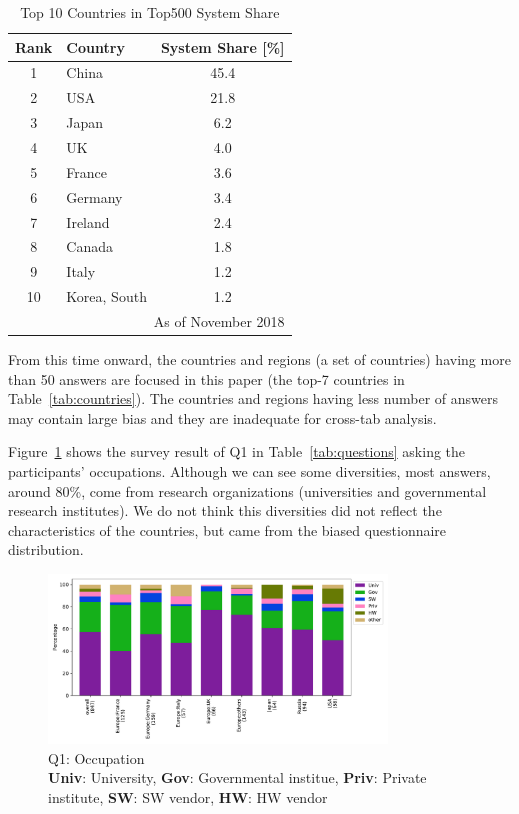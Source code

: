 \documentclass[submit,techrep,noauthor,english]{ipsj}
\begin{document}
\begin{table}[htb]%
\begin{center}%
  \caption{Top 10 Countries in Top500 System Share\cite{Top500}}
  \label{tab:top500}%
\begin{tabular}{c|l|c}%
\hline%
Rank & Country & System Share [\%] \\%
\hline%
1 & China & 45.4 \\%
2 & USA & 21.8 \\%
3 & Japan & 6.2 \\%
4 & UK & 4.0 \\%
5 & France & 3.6 \\%
6 & Germany & 3.4 \\%
7 & Ireland & 2.4 \\%
8 & Canada & 1.8 \\%
9 & Italy & 1.2 \\%
10 & Korea, South & 1.2 \\%
\hline%
\multicolumn{3}{r}{\tiny As of November 2018} \\
\end{tabular}%
\end{center}%
\end{table}%

From this time onward, the countries and regions (a set of countries)
having more than 50 answers are focused in this paper (the top-7
countries in Table~\ref{tab:countries}).  The countries and regions
having less number of answers may contain large bias and they are
inadequate for cross-tab analysis. 

Figure~\ref{fig:occupation} shows the survey result of Q1 in
Table~\ref{tab:questions} asking the participants'
occupations. Although we can see some diversities, most answers,
around 80\%, come from research organizations (universities and
governmental research institutes).  We do not think this
diversities did not reflect the characteristics of the countries, but
came from the biased questionnaire distribution. 

\begin{figure}[htb]
\begin{center}
\includegraphics[width=9cm]{../pdfs/Q1.pdf}
  \vspace{-8mm}
  \caption{Q1: Occupation\\
    {\bf Univ}: University, {\bf Gov}: Governmental institue,
    {\bf Priv}: Private institute, {\bf SW}: SW vendor,
    {\bf HW}: HW vendor}
  \label{fig:occupation}
\end{center}
\end{figure}
\end{document}
